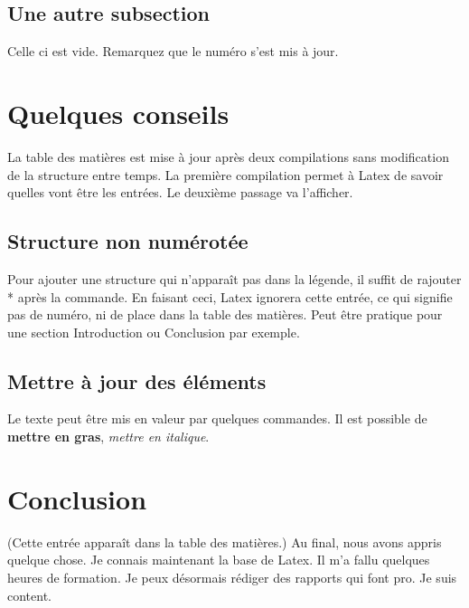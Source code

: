 \documentclass[10pt,a4paper]{report} %
\begin{document}
\subsection{Une autre subsection}
Celle ci est vide. Remarquez que le numéro s'est mis à jour.
\section{Quelques conseils}
La table des matières est mise à jour après deux compilations sans modification de la structure entre temps. La première compilation permet à Latex de savoir quelles vont être les entrées. Le deuxième passage va l'afficher.
\subsection*{Structure non numérotée}
Pour ajouter une structure qui n'apparaît pas dans la légende, il suffit de rajouter * après la commande. En faisant ceci, Latex ignorera cette entrée, ce qui signifie pas de numéro, ni de place dans la table des matières. Peut être pratique pour une section Introduction ou Conclusion par exemple.

\subsection{Mettre à jour des éléments}
Le texte peut être mis en valeur par quelques commandes. Il est possible de \textbf{mettre en gras}, \emph{mettre en italique}.

\section*{Conclusion}
(Cette entrée apparaît dans la table des matières.)
Au final, nous avons appris quelque chose. Je connais maintenant la base de Latex. Il m'a fallu quelques heures de formation. Je peux désormais rédiger des rapports qui font pro. Je suis content.
\end{document}
